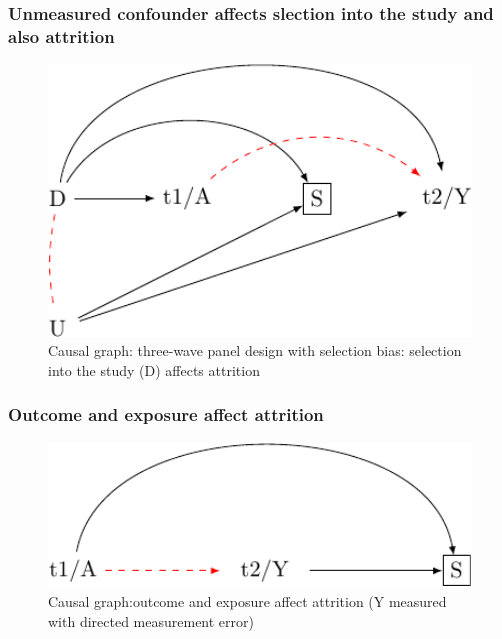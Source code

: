 \documentclass[
  singlecolumn]{report}
\begin{document}
\hypertarget{unmeasured-confounder-affects-slection-into-the-study-and-also-attrition}{%
\subsubsection{Unmeasured confounder affects slection into the study and
also
attrition}\label{unmeasured-confounder-affects-slection-into-the-study-and-also-attrition}}

\begin{figure}

{\centering \includegraphics[width=1\textwidth,height=\textheight]{causal-dags_files/figure-pdf/fig-dag-8-4-1.pdf}

}

\caption{\label{fig-dag-8-4}Causal graph: three-wave panel design with
selection bias: selection into the study (D) affects attrition}

\end{figure}

\hypertarget{outcome-and-exposure-affect-attrition}{%
\subsubsection{Outcome and exposure affect
attrition}\label{outcome-and-exposure-affect-attrition}}

\begin{figure}

{\centering \includegraphics[width=1\textwidth,height=\textheight]{causal-dags_files/figure-pdf/fig-dag-8-5-1.pdf}

}

\caption{\label{fig-dag-8-5}Causal graph:outcome and exposure affect
attrition (Y measured with directed measurement error)}

\end{figure}
\end{document}
